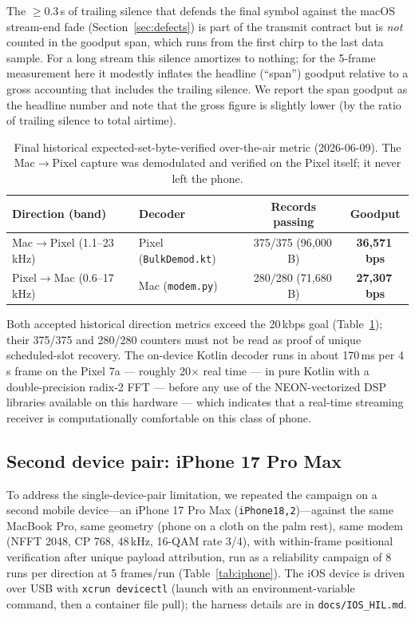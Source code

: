 \documentclass[11pt]{article}
\begin{document}
The $\geq$0.3\,s of trailing silence that defends the final symbol against the
macOS stream-end fade (Section~\ref{sec:defects}) is part of the transmit
contract but is \emph{not} counted in the goodput span, which runs from the
first chirp to the last data sample. For a long stream this silence amortizes
to nothing; for the 5-frame measurement here it modestly inflates the headline
(``span'') goodput relative to a gross accounting that includes the trailing
silence. We report the span goodput as the headline number and note that the
gross figure is slightly lower (by the ratio of trailing silence to total
airtime).

\begin{table}[t]
\centering
\caption{Final historical expected-set-byte-verified over-the-air metric
(2026-06-09). The
Mac$\rightarrow$Pixel capture was demodulated and verified on the Pixel
itself; it never left the phone.}
\label{tab:final}
\begin{tabular}{@{}llcc@{}}
\toprule
Direction (band) & Decoder & Records passing & Goodput \\
\midrule
Mac$\rightarrow$Pixel (1.1--23\,kHz) & Pixel (\texttt{BulkDemod.kt}) &
  375/375 (96{,}000\,B) & \textbf{36{,}571\,bps} \\
Pixel$\rightarrow$Mac (0.6--17\,kHz) & Mac (\texttt{modem.py}) &
  280/280 (71{,}680\,B) & \textbf{27{,}307\,bps} \\
\bottomrule
\end{tabular}
\end{table}

Both accepted historical direction metrics exceed the 20\,kbps goal
(Table~\ref{tab:final}); their 375/375 and 280/280 counters must not be read as
proof of unique scheduled-slot recovery. The on-device Kotlin decoder runs in about 170\,ms
per 4\,s frame on the Pixel 7a --- roughly 20$\times$ real time --- in pure
Kotlin with a double-precision radix-2 FFT --- before any use of the
NEON-vectorized DSP libraries available on this hardware \cite{neon,kfr} ---
which indicates that a real-time streaming receiver is computationally
comfortable on this class of phone.

\subsection{Second device pair: iPhone 17 Pro Max}
\label{sec:iphone}

To address the single-device-pair limitation, we repeated the campaign on a
second mobile device---an iPhone 17 Pro Max (\texttt{iPhone18,2})---against the
same MacBook Pro, same geometry (phone on a cloth on the palm rest), same modem
(NFFT 2048, CP 768, 48\,kHz, 16-QAM rate 3/4), with within-frame positional
verification after unique payload attribution, run as a reliability campaign of 8 runs per direction at 5
frames/run (Table~\ref{tab:iphone}). The iOS device is driven over USB with
\texttt{xcrun devicectl} (launch with an environment-variable command, then a
container file pull); the harness details are in \texttt{docs/IOS\_HIL.md}.
\end{document}
